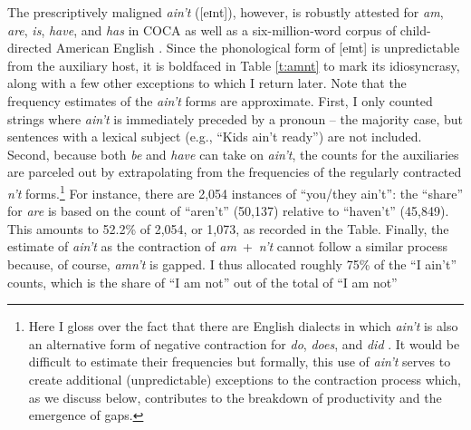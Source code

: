 \documentclass[output=paper,
modfonts
]{LSP/langsci}
\begin{document}
The prescriptively maligned \textit{ain't} ([eɪnt]), however, 
is robustly attested for \textit{am}, \textit{are}, \textit{is}, \textit{have},
and \textit{has} in COCA as well as a six-million-word corpus of
child-directed American English \citep{CHILDES}.
Since the phonological form of
[eɪnt] is unpredictable from the auxiliary host, it is boldfaced in
Table \ref{t:amnt} to mark its idiosyncrasy,  along with a few other
exceptions  to which I return later.  Note that
 the frequency estimates of the \textit{ain't} forms are 
approximate.  First, I only counted strings where \textit{ain't} is
immediately preceded by a pronoun -- the majority case, but
sentences with a lexical subject (e.g., ``Kids ain't ready'') are not
included. Second, because both \textit{be} and \textit{have} can take on \textit{ain't}, the counts 
for the auxiliaries are parceled out by extrapolating from the
frequencies of the regularly contracted \textit{
  n't} forms.\footnote{Here I gloss over the fact that there are English
  dialects in which \textit{ain't} is also an alternative form of
  negative contraction for \textit{do}, \textit{does}, and \textit{did}
  \citep[e.g.,][]{Labov1968, Weldon1994}. It would be difficult to
  estimate their frequencies but formally, this use of \textit{ain't}
 serves to create additional (unpredictable) exceptions to the contraction
  process which, as we discuss below, contributes to the breakdown of
  productivity and  the emergence of  gaps. } For
instance, there are 2,054 instances of ``you/they 
ain't'': the ``share'' for \textit{are} is based on the count of ``aren't''
(50,137) relative to  ``haven't'' (45,849). This amounts to 52.2\% of 2,054,
or 1,073, as recorded in the Table. Finally, the estimate of \textit{ain't} as the contraction of \textit{am}~+~\textit{n't} cannot follow a
similar process because, of course, \textit{amn't} is 
gapped. I thus allocated roughly 75\% of the ``I ain't'' counts,
which is the share of ``I am not'' out of the total of ``I am not''
\end{document}
